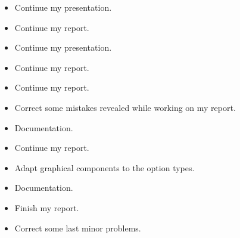 \begin{itemize}
 \item Continue my presentation.
 \item Continue my report.
\end{itemize}

\begin{itemize}
 \item Continue my presentation.
 \item Continue my report.
\end{itemize}

\begin{itemize}
 \item Continue my report.
 \item Correct some mistakes revealed while working on my report.
 \item Documentation.
\end{itemize}

\begin{itemize}
 \item Continue my report.
 \item Adapt graphical components to the option types.
 \item Documentation.
\end{itemize}

\begin{itemize}
 \item Finish my report.
 \item Correct some last minor problems.
\end{itemize}
